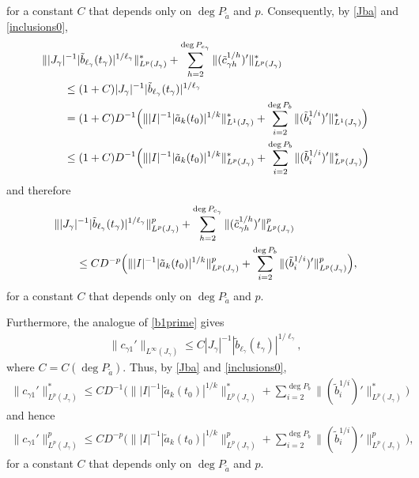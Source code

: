 \documentclass[12pt]{amsart}
\theoremstyle{plain}
\theoremstyle{definition}
\numberwithin{equation}{section}
\begin{document}
for a constant $C$ that depends only on $\deg P_{\tilde a}$ and $p$.
Consequently, by \eqref{Jba} and \eqref{inclusions0},
\begin{align*}
\MoveEqLeft
  \||J_{\gamma}|^{-1} |\tilde b_{\ell_{\gamma}}(t_{\gamma})|^{1/\ell_{\gamma}} \|^*_{L^p (J_{\gamma})}
  + \sum_{h=2}^{\deg P_{c_{\gamma}}} \|(\tilde c_{{\gamma} h}^{1/h})'\|^*_{L^p (J_{\gamma})}
  \\
  &\le (1+C) |J_{\gamma}|^{-1} |\tilde b_{\ell_{\gamma}}(t_{\gamma})|^{1/\ell_{\gamma}}
  \\
  &= (1+C) D^{-1} \Big( \| |I|^{-1}  {|\tilde a_k(t_0)|^{1/k}} \|^*_{L^1 (J_{\gamma})} 
  + \sum_{i=2}^{\deg P_b} \|(\tilde b_i^{1/i})'\|^*_{L^1 (J_{\gamma})}\Big)
  \\
  &\le (1+C)   D^{-1}   \Big( \| |I|^{-1}  {|\tilde a_k(t_0)|^{1/k}} \|^*_{L^p (J_{\gamma})} 
  + \sum_{i=2}^{\deg P_b} \|(\tilde b_i^{1/i})'\|^*_{L^p (J_{\gamma})}\Big) 
\end{align*}
and therefore 
\begin{align}
\MoveEqLeft
  \||J_{\gamma}|^{-1} |\tilde b_{\ell_{\gamma}}(t_{\gamma})|^{1/\ell_{\gamma}} \|^p_{L^p (J_{\gamma})}
  + \sum_{h=2}^{\deg P_{c_{\gamma}}} \|(\tilde c_{{\gamma} h}^{1/h})'\|^p_{L^p (J_{\gamma})}
  \notag \\
  &\le C D^{-p}  \Big( \| |I|^{-1}  {|\tilde a_k(t_0)|^{1/k}} \|^p_{L^p (J_{\gamma})} 
  + \sum_{i=2}^{\deg P_b} \|(\tilde b_i^{1/i})'\|^p_{L^p (J_{\gamma})}\Big), \label{cba}
\end{align}
for a constant $C$ that depends only on $\deg P_{\tilde a}$ and $p$.

Furthermore, the analogue of \eqref{b1prime} gives 
\begin{align*}  
    \|c_{{\gamma} 1}'\|_{L^\infty(J_{\gamma})}   \le C  |J_{\gamma}|^{-1}  |\tilde b_{\ell_{\gamma}} (t_{\gamma})|^{1/\ell_{\gamma}},
\end{align*} 
where $C=C(\deg P_{\tilde a})$.
Thus, by \eqref{Jba} and \eqref{inclusions0},
\begin{align*}  
    \|c_{{\gamma} 1}'\|^*_{L^p(J_{\gamma})} \le C D^{-1}  \Big( \| |I|^{-1}  {|\tilde a_k(t_0)|^{1/k}} \|^*_{L^p (J_{\gamma})} 
  + \sum_{i=2}^{\deg P_b} \|(\tilde b_i^{1/i})'\|^*_{L^p (J_{\gamma})}\Big)
\end{align*}
and hence
\begin{align}  \label{c1prime}
    \|c_{{\gamma} 1}'\|^p_{L^p(J_{\gamma})} \le C D^{-p}  \Big( \| |I|^{-1}  {|\tilde a_k(t_0)|^{1/k}} \|^p_{L^p (J_{\gamma})} 
  + \sum_{i=2}^{\deg P_b} \|(\tilde b_i^{1/i})'\|^p_{L^p (J_{\gamma})}\Big),
\end{align}
for a constant $C$ that depends only on $\deg P_{\tilde a}$ and $p$.
\end{document}
